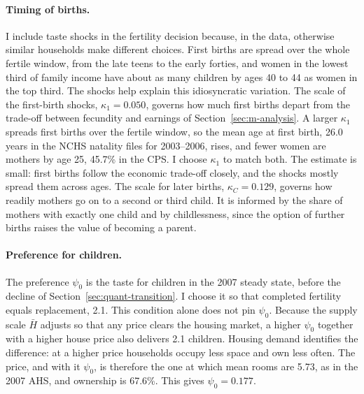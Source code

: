 \paragraph{Timing of births.}
I include taste shocks in the fertility decision because, in the data,
otherwise similar households make different choices. First births are spread
over the whole fertile window, from the late teens to the early forties, and
women in the lowest third of family income have about as many children by
ages 40 to 44 as women in the top third. The shocks help explain this
idiosyncratic variation. The scale of the first-birth shocks,
$\kappa_1=0.050$, governs how much first births depart from the trade-off
between fecundity and earnings of Section~\ref{sec:m-analysis}. A larger
$\kappa_1$ spreads first births over the fertile window, so the mean age at
first birth, 26.0 years in the NCHS natality files for 2003--2006, rises,
and fewer women are mothers by age 25, 45.7\% in the CPS. I choose
$\kappa_1$ to match both. The estimate is small: first births follow the
economic trade-off closely, and the shocks mostly spread them across ages.
The scale for later births, $\kappa_C=0.129$, governs how readily mothers go
on to a second or third child. It is informed by the share of mothers with
exactly one child and by childlessness, since the option of further births
raises the value of becoming a parent.

\paragraph{Preference for children.}
The preference $\psi_0$ is the taste for children in the 2007 steady state,
before the decline of Section~\ref{sec:quant-transition}. I choose it so that
completed fertility equals replacement, 2.1. This condition alone does not
pin $\psi_0$. Because the supply scale $\bar H$ adjusts so that any price clears
the housing market, a higher $\psi_0$ together with a higher house price also
delivers 2.1 children. Housing demand identifies the difference: at a higher
price households occupy less space and own less often. The price, and with it
$\psi_0$, is therefore the one at which mean rooms are 5.73, as in the 2007
AHS, and ownership is 67.6\%. This gives $\psi_0=0.177$.

